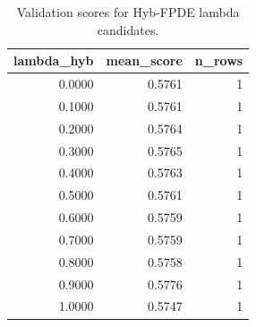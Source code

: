 \begin{table}[t]
\caption{Validation scores for Hyb-FPDE lambda candidates.}
\label{tab:lambda_distribution_computed}
\centering
\begin{tabular}{rrr}
\toprule
lambda\_hyb & mean\_score & n\_rows \\
\midrule
0.0000 & 0.5761 & 1 \\
0.1000 & 0.5761 & 1 \\
0.2000 & 0.5764 & 1 \\
0.3000 & 0.5765 & 1 \\
0.4000 & 0.5763 & 1 \\
0.5000 & 0.5761 & 1 \\
0.6000 & 0.5759 & 1 \\
0.7000 & 0.5759 & 1 \\
0.8000 & 0.5758 & 1 \\
0.9000 & 0.5776 & 1 \\
1.0000 & 0.5747 & 1 \\
\bottomrule
\end{tabular}

\end{table}
